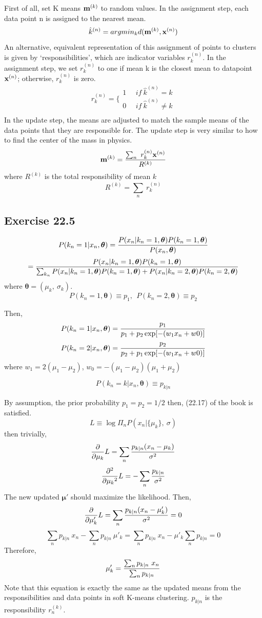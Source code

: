 \documentclass[a4paper,11pt]{article}
\newcommand{\vect}[1]{\boldsymbol{\mathbf{#1}}}
\numberwithin{equation}{section}
\begin{document}
{First of all, set K means {${\textbf m}^{(k)}$} to random values. In the assignment step, each data point n is
assigned to the nearest mean. 
$$
\hat k^{(n)} = argmin_k d({\textbf m}^{(k)}, {\textbf x}^{(n)})
$$
An alternative, equivalent representation of this assignment of
points to clusters is given by `responsibilities', which are indicator
variables $r^{(n)}_k$. In the assignment step, we set $r^{(n)}_k$ to one if mean k is the closest mean to datapoint $ {\textbf x}^{(n)}$; otherwise, $r^{(n)}_k$ is zero.
$$
r^{(n)}_k = \{
\begin{array}{cc}
1 ~~~~~~if ~\hat k^{(n)}=k\\
0 ~~~~~~if ~\hat k^{(n)}\ne k\\
\end{array}
$$
In the update step, the means are adjusted to
match the sample means of the data points that they are responsible for. The update step is very similar to how to find the center of the mass in physics. 
$$
{\textbf m}^{(k)}= {\sum_n ~ r^{(n)}_k {\textbf x}^{(n)} \over R^{(k)}}
$$
where $R^{(k)}$ is the total responsibility of mean $k$
$$
R^{(k)}=\sum_n~r^{(n)}_k
$$




\subsection{Exercise 22.5}
$$
P(k_n = 1|x_n, \vect{\theta})= {P(x_n|k_n=1,\vect{\theta})P(k_n=1,\vect{\theta}) \over P(x_n,\vect{\theta})}
$$
$$
= {P(x_n|k_n=1,\vect{\theta})P(k_n=1,\vect{\theta}) \over \sum_{k_n}  P(x_n|k_n=1,\vect{\theta})P(k_n=1,\vect{\theta}) +P(x_n|k_n=2,\vect{\theta})P(k_n=2,\vect{\theta}) }
$$
where $\vect{\theta}=(\mu_k, ~\sigma_k)$. 
$$
P(k_n=1,\vect{\theta}) \equiv p_1,~~P(k_n=2,\vect{\theta}) \equiv p_2
$$

Then, 
$$
P(k_n=1|x_n,\vect{\theta})= {p_1 \over p_1+p_2 \exp[-(w_1x_n+w0)]}
$$
$$
P(k_n=2|x_n,\vect{\theta})= {p_2 \over p_2+p_1 \exp[-(w_1x_n+w0)]}
$$
where $w_1=2(\mu_1-\mu_2)$, $w_0=-(\mu_1-\mu_2)(\mu_1+\mu_2)$

$$
P(k_n=k|x_n,\vect{\theta}) \equiv p_{k|n}
$$

By assumption, the prior probability $p_1=p_2=1/2$ then, (22.17) of the book is satisfied. 
$$
L\equiv \log \Pi_n P(x_n|\{\mu_k\},~\sigma)
$$
then trivially, 
$$
{\partial \over \partial{\mu_k}}L = \sum_n  {p_{k|n} (x_n-\mu_k)\over \sigma^2}
$$
$$
{\partial^2 \over \partial{\mu_k}^2}L = -\sum_n  {p_{k|n}  \over \sigma^2}
$$
The new updated $\vect \mu'$ should maximize the likelihood. Then,
$$
{\partial \over \partial{\mu_k'}}L = \sum_n  {p_{k|n} (x_n-\mu_k')\over \sigma^2}=0
$$
$$
\sum_n p_{k|n} ~x_n - \sum_n p_{k|n} ~\mu'_k=\sum_n p_{k|n} ~x_n -  \mu'_k\sum_n p_{k|n}=0
$$
Therefore,
$$
\mu'_k={\sum_n p_{k|n} ~x_n \over \sum_n p_{k|n} }
$$
Note that this equation is exactly the same as the updated means from the responsibilities and data points in soft K-means clustering. $p_{k|n}$ is the responsibility $r^{(k)}_n$.

}
\end{document}
